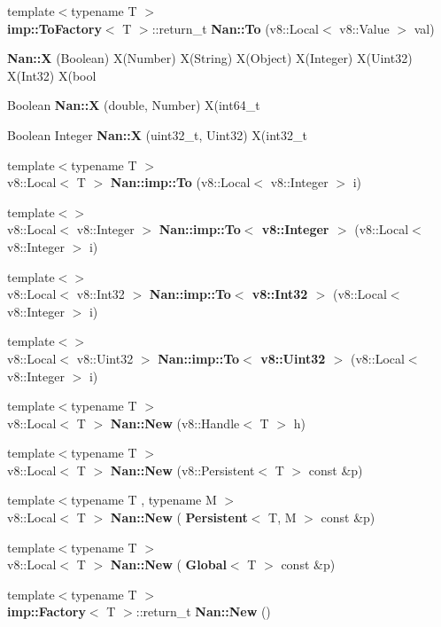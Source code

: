 \begin{DoxyCompactItemize}
\item 
{\footnotesize template$<$typename T $>$ }\\\textbf{ imp\+::\+To\+Factory}$<$ T $>$\+::return\+\_\+t \textbf{ Nan\+::\+To} (v8\+::\+Local$<$ v8\+::\+Value $>$ val)
\item 
\textbf{ Nan\+::X} (Boolean) X(Number) X(String) X(Object) X(Integer) X(Uint32) X(Int32) X(bool
\item 
Boolean \textbf{ Nan\+::X} (double, Number) X(int64\+\_\+t
\item 
Boolean Integer \textbf{ Nan\+::X} (uint32\+\_\+t, Uint32) X(int32\+\_\+t
\item 
{\footnotesize template$<$typename T $>$ }\\v8\+::\+Local$<$ T $>$ \textbf{ Nan\+::imp\+::\+To} (v8\+::\+Local$<$ v8\+::\+Integer $>$ i)
\item 
{\footnotesize template$<$$>$ }\\v8\+::\+Local$<$ v8\+::\+Integer $>$ \textbf{ Nan\+::imp\+::\+To$<$ v8\+::\+Integer $>$} (v8\+::\+Local$<$ v8\+::\+Integer $>$ i)
\item 
{\footnotesize template$<$$>$ }\\v8\+::\+Local$<$ v8\+::\+Int32 $>$ \textbf{ Nan\+::imp\+::\+To$<$ v8\+::\+Int32 $>$} (v8\+::\+Local$<$ v8\+::\+Integer $>$ i)
\item 
{\footnotesize template$<$$>$ }\\v8\+::\+Local$<$ v8\+::\+Uint32 $>$ \textbf{ Nan\+::imp\+::\+To$<$ v8\+::\+Uint32 $>$} (v8\+::\+Local$<$ v8\+::\+Integer $>$ i)
\item 
{\footnotesize template$<$typename T $>$ }\\v8\+::\+Local$<$ T $>$ \textbf{ Nan\+::\+New} (v8\+::\+Handle$<$ T $>$ h)
\item 
{\footnotesize template$<$typename T $>$ }\\v8\+::\+Local$<$ T $>$ \textbf{ Nan\+::\+New} (v8\+::\+Persistent$<$ T $>$ const \&p)
\item 
{\footnotesize template$<$typename T , typename M $>$ }\\v8\+::\+Local$<$ T $>$ \textbf{ Nan\+::\+New} (\textbf{ Persistent}$<$ T, M $>$ const \&p)
\item 
{\footnotesize template$<$typename T $>$ }\\v8\+::\+Local$<$ T $>$ \textbf{ Nan\+::\+New} (\textbf{ Global}$<$ T $>$ const \&p)
\item 
{\footnotesize template$<$typename T $>$ }\\\textbf{ imp\+::\+Factory}$<$ T $>$\+::return\+\_\+t \textbf{ Nan\+::\+New} ()

\end{DoxyCompactItemize}
